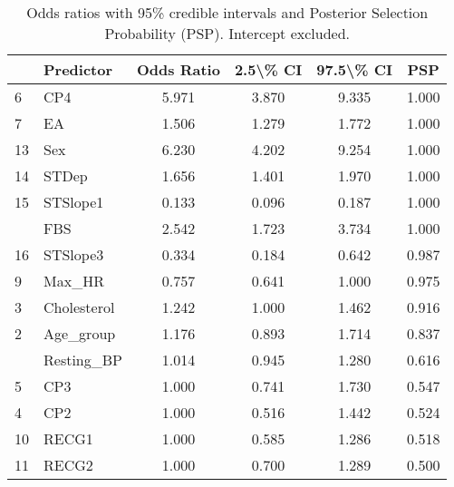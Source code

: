 \begin{table}

\caption{Odds ratios with 95\% credible intervals and Posterior Selection Probability (PSP). Intercept excluded.}
\centering
\begin{tabular}[t]{llcccc}
\toprule
  & Predictor & Odds Ratio & 2.5\textbackslash{}\% CI & 97.5\textbackslash{}\% CI & PSP\\
\midrule
6 & CP4 & 5.971 & 3.870 & 9.335 & 1.000\\
7 & EA & 1.506 & 1.279 & 1.772 & 1.000\\
13 & Sex & 6.230 & 4.202 & 9.254 & 1.000\\
14 & STDep & 1.656 & 1.401 & 1.970 & 1.000\\
15 & STSlope1 & 0.133 & 0.096 & 0.187 & 1.000\\
\addlinespace
8 & FBS & 2.542 & 1.723 & 3.734 & 1.000\\
16 & STSlope3 & 0.334 & 0.184 & 0.642 & 0.987\\
9 & Max\_HR & 0.757 & 0.641 & 1.000 & 0.975\\
3 & Cholesterol & 1.242 & 1.000 & 1.462 & 0.916\\
2 & Age\_group & 1.176 & 0.893 & 1.714 & 0.837\\
\addlinespace
12 & Resting\_BP & 1.014 & 0.945 & 1.280 & 0.616\\
5 & CP3 & 1.000 & 0.741 & 1.730 & 0.547\\
4 & CP2 & 1.000 & 0.516 & 1.442 & 0.524\\
10 & RECG1 & 1.000 & 0.585 & 1.286 & 0.518\\
11 & RECG2 & 1.000 & 0.700 & 1.289 & 0.500\\
\bottomrule
\end{tabular}
\end{table}
